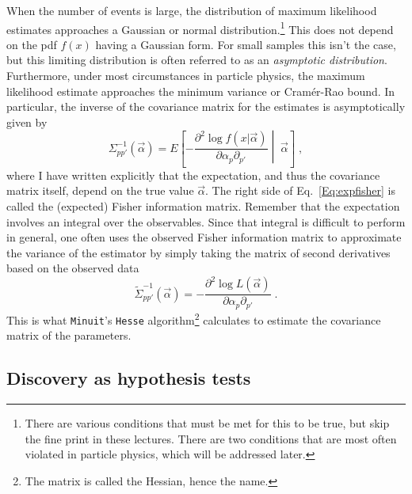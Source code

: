 When the number of events is large, the distribution of maximum likelihood estimates approaches a Gaussian or normal distribution.\footnote{There are various conditions that must be met for this to be true, but skip the fine print in these lectures.  There are two conditions that are most often violated in particle physics, which will be addressed later.}  This does not depend on the pdf $f(x)$ having a Gaussian form.  For small samples this isn't the case, but this limiting distribution is often referred to as an \textit{asymptotic distribution}.
Furthermore, under most circumstances in particle physics, the maximum likelihood estimate approaches the minimum variance or Cram\'er-Rao bound. In particular, the inverse of the covariance matrix for the estimates is asymptotically given by
\begin{equation}
\label{Eq:expfisher}
\Sigma_{pp'}^{-1}(\vec\alpha) = E\left[- \frac{\partial^2 \log f(x|\vec{\alpha})}{\partial\alpha_p \partial_{p'}}  \middle| \;\vec\alpha \right ]  \;,
\end{equation}
where I have written explicitly that the expectation, and thus the covariance matrix itself, depend on the true value $\vec\alpha$.  The right side of Eq.~\ref{Eq:expfisher} is called the (expected) Fisher information matrix. Remember that the expectation involves an integral over the observables.  Since that integral is difficult to perform in general, one often uses the observed Fisher information matrix to approximate the variance of the estimator by simply taking the matrix of second derivatives based on the observed data
\begin{equation}
\label{Eq:obsfisher}
\tilde\Sigma_{pp'}^{-1}(\vec\alpha) = - \frac{\partial^2 \log L(\vec{\alpha})}{\partial\alpha_p \partial_{p'}}  \; .
\end{equation}
This is what \texttt{Minuit}'s \texttt{Hesse} algorithm\footnote{The matrix is called the Hessian, hence the name.} calculates to estimate the covariance matrix of the parameters.


\subsection{Discovery as hypothesis tests}\label{S:hypothesis test}


